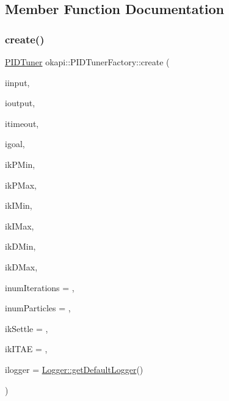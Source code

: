 \subsection{Member Function Documentation}
\mbox{\label{classokapi_1_1PIDTunerFactory_afe5edc3050334e81b98a956c4a9392fe}} 
\subsubsection{\texorpdfstring{create()}{create()}}
{\footnotesize\ttfamily \mbox{\hyperlink{classokapi_1_1PIDTuner}{P\+I\+D\+Tuner}} okapi\+::\+P\+I\+D\+Tuner\+Factory\+::create (\begin{DoxyParamCaption}\item[{const std\+::shared\+\_\+ptr$<$ \mbox{\hyperlink{classokapi_1_1ControllerInput}{Controller\+Input}}$<$ double $>$$>$ \&}]{iinput,  }\item[{const std\+::shared\+\_\+ptr$<$ \mbox{\hyperlink{classokapi_1_1ControllerOutput}{Controller\+Output}}$<$ double $>$$>$ \&}]{ioutput,  }\item[{Q\+Time}]{itimeout,  }\item[{std\+::int32\+\_\+t}]{igoal,  }\item[{double}]{ik\+P\+Min,  }\item[{double}]{ik\+P\+Max,  }\item[{double}]{ik\+I\+Min,  }\item[{double}]{ik\+I\+Max,  }\item[{double}]{ik\+D\+Min,  }\item[{double}]{ik\+D\+Max,  }\item[{std\+::int32\+\_\+t}]{inum\+Iterations = {},  }\item[{std\+::int32\+\_\+t}]{inum\+Particles = {},  }\item[{double}]{ik\+Settle = {},  }\item[{double}]{ik\+I\+T\+AE = {},  }\item[{const std\+::shared\+\_\+ptr$<$ \mbox{\hyperlink{classokapi_1_1Logger}{Logger}} $>$ \&}]{ilogger = {\ttfamily \mbox{\hyperlink{classokapi_1_1Logger_a5053cf778b4b55acba788a3797dc96d2}{Logger\+::get\+Default\+Logger}}()} }\end{DoxyParamCaption})\hspace{0.3cm}{\ttfamily [static]}}

